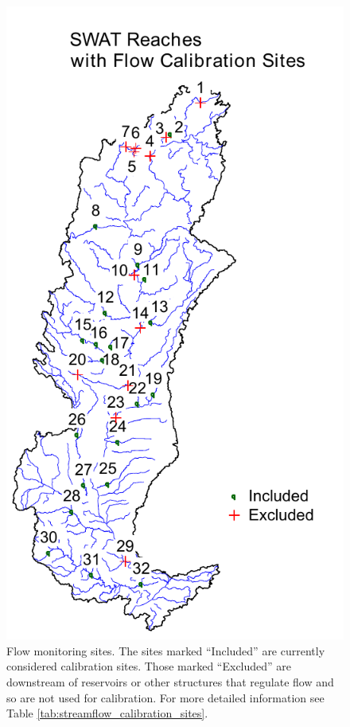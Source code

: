 \begin{figure}[h]
	\centering
	\includegraphics{./img/flow_calib_sites_changed}
	\caption[Flow monitoring sites]{Flow monitoring sites. The sites marked ``Included'' are currently considered calibration sites. Those marked ``Excluded'' are downstream of reservoirs or other structures that regulate flow and so are not used for calibration. For more detailed information see Table \ref{tab:streamflow_calibration_sites}.}
	\label{fig:calibration_site_map}
\end{figure}
\clearpage